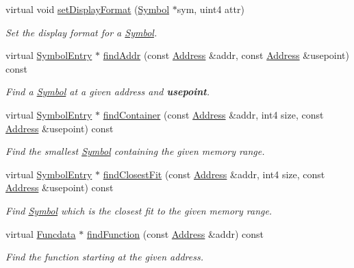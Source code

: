 \begin{DoxyCompactItemize}
virtual void \mbox{\hyperlink{class_scope_internal_a4f5d61b1f41e067018e1cc4ecc044536}{set\+Display\+Format}} (\mbox{\hyperlink{class_symbol}{Symbol}} $\ast$sym, uint4 attr)
\begin{DoxyCompactList}\small\item\em Set the display format for a \mbox{\hyperlink{class_symbol}{Symbol}}. \end{DoxyCompactList}\item 
virtual \mbox{\hyperlink{class_symbol_entry}{Symbol\+Entry}} $\ast$ \mbox{\hyperlink{class_scope_internal_ac256d087718065edb1c3a96fbfdf7a33}{find\+Addr}} (const \mbox{\hyperlink{class_address}{Address}} \&addr, const \mbox{\hyperlink{class_address}{Address}} \&usepoint) const
\begin{DoxyCompactList}\small\item\em Find a \mbox{\hyperlink{class_symbol}{Symbol}} at a given address and {\bfseries{usepoint}}. \end{DoxyCompactList}\item 
virtual \mbox{\hyperlink{class_symbol_entry}{Symbol\+Entry}} $\ast$ \mbox{\hyperlink{class_scope_internal_ae1eedf2f27fd8b0a7431568c4e4e2994}{find\+Container}} (const \mbox{\hyperlink{class_address}{Address}} \&addr, int4 size, const \mbox{\hyperlink{class_address}{Address}} \&usepoint) const
\begin{DoxyCompactList}\small\item\em Find the smallest \mbox{\hyperlink{class_symbol}{Symbol}} containing the given memory range. \end{DoxyCompactList}\item 
virtual \mbox{\hyperlink{class_symbol_entry}{Symbol\+Entry}} $\ast$ \mbox{\hyperlink{class_scope_internal_a27135ecccccc6784b292a354d6801289}{find\+Closest\+Fit}} (const \mbox{\hyperlink{class_address}{Address}} \&addr, int4 size, const \mbox{\hyperlink{class_address}{Address}} \&usepoint) const
\begin{DoxyCompactList}\small\item\em Find \mbox{\hyperlink{class_symbol}{Symbol}} which is the closest fit to the given memory range. \end{DoxyCompactList}\item 
virtual \mbox{\hyperlink{class_funcdata}{Funcdata}} $\ast$ \mbox{\hyperlink{class_scope_internal_a03a52c629c51ad660eec8d10cf7f92aa}{find\+Function}} (const \mbox{\hyperlink{class_address}{Address}} \&addr) const
\begin{DoxyCompactList}\small\item\em Find the function starting at the given address. \end{DoxyCompactList}\item 

\end{DoxyCompactItemize}
